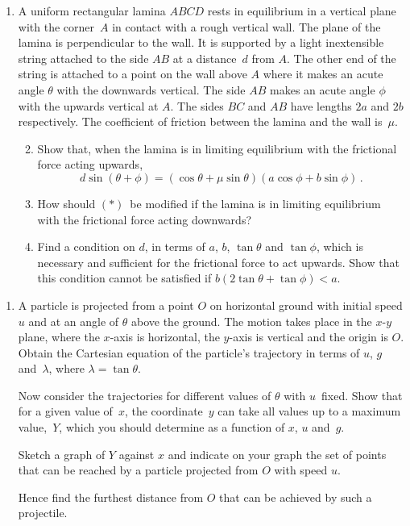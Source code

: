 \documentclass[a4, 11pt]{report}
\newlength{\qspace}
\newcounter{qnumber}
\newenvironment{question}%
 {\vspace{\qspace}
  \begin{enumerate}[\bfseries 1\quad][10]%
    \setcounter{enumi}{\value{qnumber}}%
    \item%
 }
{
  \end{enumerate}
  \filbreak
  \stepcounter{qnumber}
 }
\newenvironment{questionparts}[1][1]%
 {
  \begin{enumerate}[\bfseries (i)]%
    \setcounter{enumii}{#1}
    \addtocounter{enumii}{-1}
    \setlength{\itemsep}{5mm}
    \setlength{\parskip}{8pt}
 }
 {
  \end{enumerate}
 }
\renewcommand{\.}[1]{\ensuremath{\mathrm{#1}}}
\newcommand{\+}[1]{\ensuremath{\mathbf{#1}}}
\begin{document}
	
\begin{question}
  A uniform rectangular lamina $ABCD$ rests in equilibrium in a
  vertical plane with the \mbox{corner~$A$} in contact with a rough vertical
  wall. The plane of the lamina is perpendicular to the wall.
It is supported by a light inextensible string attached to the
  side $AB$ at a distance~$d$ from $A$. The other end of the string is
  attached to a point on the wall above $A$ 
where it makes an acute angle  $\theta$
  with the downwards vertical.  The side $AB$ makes an acute angle
  $\phi$ with the upwards vertical at $A$. The sides $BC$ and $AB$
  have lengths $2a$ and $2b$ respectively. The coefficient of friction
  between the lamina and the wall is~$\mu$.

  \begin{questionparts}
  \item Show that, when the lamina is in limiting equilibrium with the
    frictional force acting upwards,
    \begin{equation}
      \label{eq:9*}
      d\sin(\theta +\phi) = (\cos\theta +\mu \sin\theta)(a\cos\phi
      +b\sin\phi)\,.  \tag{$*$}
    \end{equation}

  \item How should $(*)$~be modified if the lamina is in
    limiting equilibrium with the frictional force acting downwards?

  \item Find a condition on $d$, in terms of $a$, $b$, $\tan\theta$
    and $\tan\phi$, which is necessary and sufficient for the
    frictional force to act upwards. Show that this condition cannot be
satisfied if $b(2\tan\theta+ \tan \phi)<a$.
  \end{questionparts}
	\end{question}
	
\begin{question}	
  A particle is projected from a point $O$ on horizontal ground 
with initial speed $u$ and at an angle of
  $\theta$ above the ground.  The motion takes place in the
  $x$-$y$ plane, where the $x$-axis is horizontal, the $y$-axis is 
vertical and 
 the origin is  $O$.
    Obtain the Cartesian equation of the particle's trajectory in
    terms of $u$, $g$ and~$\lambda$, where $\lambda=\tan\theta$.
    
Now consider the trajectories for different values of $\theta$
    with $u$~fixed.  Show that for a given value of~$x$, the
    coordinate~$y$ can take all values up to a maximum value,~$Y$,
    which you should determine as a function of $x$, $u$ and~$g$.

    Sketch a graph of $Y$ against $x$ and indicate on your graph 
    the set of points that can be reached by a particle projected
    from $O$ with speed $u$.

    Hence find the furthest distance from $O$ that can be achieved 
     by such a projectile.
\end{question}
\end{document}

